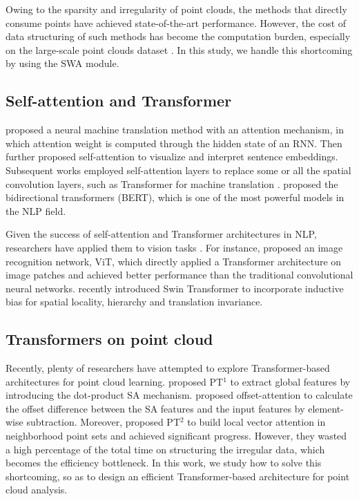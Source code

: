 \documentclass[10pt,twocolumn,letterpaper]{article}
\begin{document}
Owing to the sparsity and irregularity of point clouds, the methods that directly consume points have achieved state-of-the-art performance. However, the cost of data structuring of such methods has become the computation burden, especially on the large-scale point clouds dataset \cite{2019Point,xu2020grid}. In this study, we handle this shortcoming by using the SWA module.

\subsection{Self-attention and Transformer}
\cite{bahdanau2014neural} proposed a neural machine translation method with an attention mechanism, in which attention weight is computed through the hidden state of an RNN. Then \cite{lin2017structured} further proposed self-attention to visualize and interpret sentence embeddings. 
Subsequent works employed self-attention layers to replace some or all the spatial convolution layers, such as Transformer for machine translation \cite{2017Attention}. \cite{2018BERT} proposed the bidirectional transformers (BERT), which is one of the most powerful models in the NLP field. 

Given the success of self-attention and Transformer architectures in NLP, researchers have applied
them to vision tasks \cite{2019Local,DBLP:journals/corr/abs-1906-05909,2020Exploring}. For instance, \cite{DBLP:journals/corr/abs-2010-11929} proposed an image recognition network, ViT, which directly applied a Transformer architecture on image patches and achieved better performance than the traditional convolutional neural networks. \cite{liu2021swin} recently introduced Swin Transformer to incorporate inductive bias for spatial locality, hierarchy and translation invariance.

\subsection{Transformers on point cloud}
Recently, plenty of researchers have attempted to explore Transformer-based architectures for point cloud learning. \cite{Nico} proposed PT$^1$ to extract global features by introducing the dot-product SA mechanism. \cite{guo2020pct} proposed offset-attention to calculate the offset difference between the SA features and the input features by element-wise subtraction. Moreover, \cite{2020Point} proposed PT$^2$ to build local vector attention in neighborhood point sets and achieved significant progress. However, they wasted a high percentage of the total time on structuring the irregular data, which becomes the efficiency bottleneck. In this work, we study how to solve this shortcoming, so as to design an efficient Transformer-based architecture for point cloud analysis.
\end{document}

